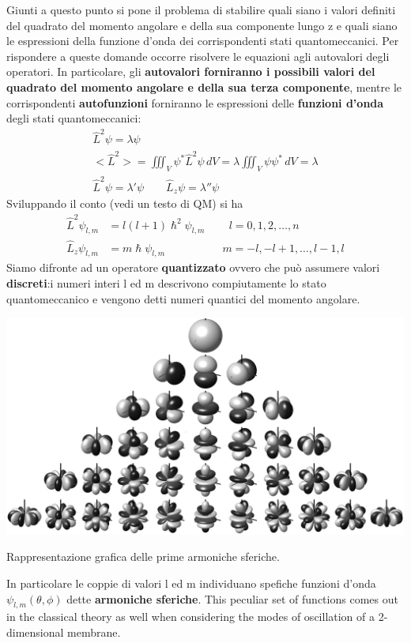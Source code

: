 Giunti a questo punto si pone il problema di stabilire quali siano i
valori definiti del quadrato del momento angolare e della sua componente
lungo z e quali siano le espressioni della funzione d'onda dei
corrispondenti stati quantomeccanici.
Per rispondere a queste domande
occorre risolvere le equazioni agli autovalori degli operatori.
In
particolare, gli \textbf{autovalori forniranno i possibili valori del
quadrato del momento angolare e della sua terza componente}, mentre le
corrispondenti \textbf{autofunzioni} forniranno le espressioni delle
\textbf{funzioni d'onda} degli stati quantomeccanici: \begin{gather*}
                                                          \hat{L}^{2}\psi = \lambda \psi\\
                                                          < \hat{L}^{2}> = \iiint_{V} \psi^{*} \hat{L}^{2}\psi \, dV = \lambda \iiint_{V} \psi \psi^{*} \, dV = \lambda\\
                                                          \hat{L}^{2} \psi = \lambda' \psi \qquad  \hat{L}_{z} \psi = \lambda'' \psi
\end{gather*}
Sviluppando il conto (vedi un testo di QM) si ha
\begin{align*}
    \hat{L}^{2}\psi_{l,m} &= l(l+1) \hslash^{2} \psi_{l,m} \qquad  \, l = 0,1,2, \dots , n\\
    \hat{L}_{z} \psi_{l,m} &= m \hslash \psi_{l,m} \qquad  \qquad \quad \, m = -l,-l + 1, \dots ,l-1, l
\end{align*} Siamo difronte ad un operatore \textbf{quantizzato} ovvero che può
assumere valori \textbf{discreti}:i numeri interi l ed m descrivono
compiutamente lo stato quantomeccanico e vengono detti numeri quantici
del momento angolare.\\
\begin{marginfigure}
    \includegraphics{figs/spherical-harmonics}
    \caption{Rappresentazione grafica delle prime armoniche sferiche.}
    \label{fig:spherical-harmonics}
\end{marginfigure}
In particolare le coppie di valori l ed m individuano spefiche funzioni
d'onda \(\psi_{l,m}(\theta,\phi)\) dette \textbf{armoniche sferiche}.
This peculiar set of functions comes out in the classical theory as well
when considering the modes of oscillation of a 2-dimensional membrane.

